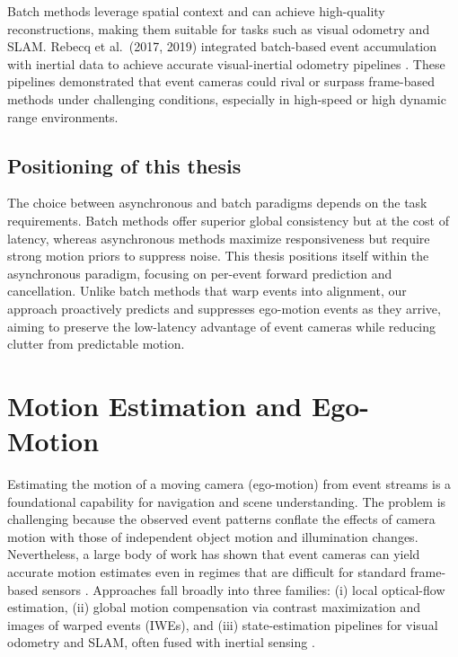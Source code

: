 Batch methods leverage spatial context and can achieve high-quality reconstructions, making them suitable for tasks such as visual odometry and SLAM. Rebecq et al.\ (2017, 2019) integrated batch-based event accumulation with inertial data to achieve accurate visual-inertial odometry pipelines \cite{Rebecq2017,Rebecq2019}. These pipelines demonstrated that event cameras could rival or surpass frame-based methods under challenging conditions, especially in high-speed or high dynamic range environments.

\subsection{Positioning of this thesis}
The choice between asynchronous and batch paradigms depends on the task requirements. Batch methods offer superior global consistency but at the cost of latency, whereas asynchronous methods maximize responsiveness but require strong motion priors to suppress noise. This thesis positions itself within the asynchronous paradigm, focusing on per-event forward prediction and cancellation. Unlike batch methods that warp events into alignment, our approach proactively predicts and suppresses ego-motion events as they arrive, aiming to preserve the low-latency advantage of event cameras while reducing clutter from predictable motion.

\section{Motion Estimation and Ego-Motion}
\label{sec:ego-motion}

Estimating the motion of a moving camera (ego-motion) from event streams is a foundational capability for navigation and scene understanding. The problem is challenging because the observed event patterns conflate the effects of camera motion with those of independent object motion and illumination changes. Nevertheless, a large body of work has shown that event cameras can yield accurate motion estimates even in regimes that are difficult for standard frame-based sensors \cite{Gallego2020Survey}. Approaches fall broadly into three families: (i) local optical-flow estimation, (ii) global motion compensation via contrast maximization and images of warped events (IWEs), and (iii) state-estimation pipelines for visual odometry and SLAM, often fused with inertial sensing \cite{Bardow2016SOFIE,Gallego2018CMax,Rebecq2017,Rebecq2019}.

